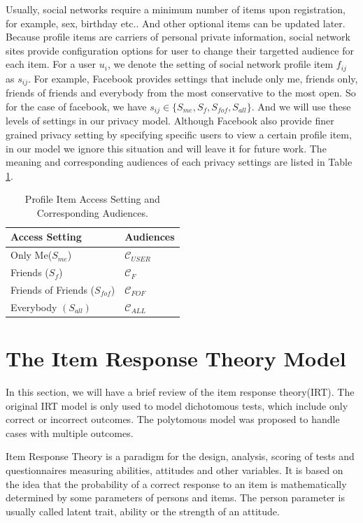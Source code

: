 \documentclass[a4paper]{article}
\begin{document}
Usually, social networks require a minimum number of items upon
registration, for example, sex, birthday etc.. And other optional
items can be updated later. Because profile items are carriers of
personal private information, social network sites provide
configuration options for user to change their targetted audience for
each item. For a user $u_i$, we denote the setting of social network
profile item $f_{ij}$ as $s_{ij}$. For example, Facebook provides
settings that include only me, friends only, friends of friends and
everybody from the most conservative to the most open. So for the case
of facebook, we have $s_{ij}\in \{S_{me},S_f,S_{fof},S_{all}\}$. And
we will use these levels of settings in our privacy model.
Although Facebook also provide finer grained privacy setting by
specifying specific users to view a certain profile item, in our model
we ignore this situation and will leave it for future work. The
meaning and corresponding audiences of each privacy settings are
listed in Table \ref{tbl:setting}.

\begin{table}[h]
  \centering
  \begin{tabular}{l|l}
    \toprule
    \textbf{Access Setting} & \textbf{Audiences} \\ \toprule
    Only Me($S_{me}$) & $\mathcal{C}_{USER}$\\ \midrule
    Friends ($S_f$) & $\mathcal{C}_F$ \\ \midrule
    Friends of Friends ($S_{fof}$) & $\mathcal{C}_{FOF}$ \\ \midrule
    Everybody $(S_{all})$ & $\mathcal{C}_{ALL}$ \\ \bottomrule
  \end{tabular}
  \caption{Profile Item Access Setting and Corresponding Audiences.}
  \label{tbl:setting}
\end{table}

\section{The Item Response Theory Model}
In this section, we will have a brief review of the item response theory(IRT). The original IRT model is only used to model dichotomous tests, which include only correct or incorrect outcomes. The polytomous model was proposed to handle cases with multiple outcomes.

Item Response Theory is a paradigm for the design, analysis, scoring of tests and questionnaires measuring abilities, attitudes and other variables. It is based on the idea that the probability of a correct response to an item is mathematically determined by some parameters of persons and items. The person parameter is usually called latent trait, ability or the strength of an attitude.
\end{document}
